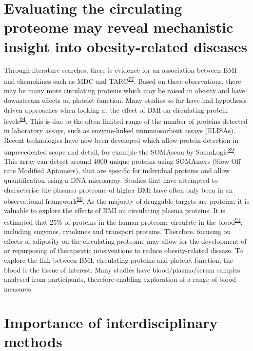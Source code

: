 \documentclass[11pt,twoside]{bristolthesis}
\begin{document}
\hypertarget{evaluating-the-circulating-proteome-may-reveal-mechanistic-insight-into-obesity-related-diseases}{%
\section{Evaluating the circulating proteome may reveal mechanistic insight into obesity-related diseases}\label{evaluating-the-circulating-proteome-may-reveal-mechanistic-insight-into-obesity-related-diseases}}

Through literature searches, there is evidence for an association between BMI and chemokines such as MDC and TARC\textsuperscript{\protect\hyperlink{ref-Kitahara2014}{77}}. Based on these observations, there may be many more circulating proteins which may be raised in obesity and have downstream effects on platelet function. Many studies so far have had hypothesis driven approaches when looking at the effect of BMI on circulating protein levels\textsuperscript{\protect\hyperlink{ref-Timpson2011}{84}}. This is due to the often limited range of the number of proteins detected in laboratory assays, such as enzyme-linked immunosorbent assays (ELISAs). Recent technologies have now been developed which allow protein detection in unprecedented scope and detail, for example the SOMAscan by SomaLogic\textsuperscript{\protect\hyperlink{ref-Gold2012}{89}}. This array can detect around 4000 unique proteins using SOMAmers (Slow Off-rate Modified Aptamers), that are specific for individual proteins and allow quantification using a DNA microarray. Studies that have attempted to characterise the plasmsa proteome of higher BMI have often only been in an observational framework\textsuperscript{\protect\hyperlink{ref-Cominetti2018}{90}}. As the majority of druggable targets are proteins, it is valuable to explore the effects of BMI on circulating plasma proteins. It is estimated that 25\% of proteins in the human proteome circulate in the blood\textsuperscript{\protect\hyperlink{ref-Imming2006}{91}}, including enzymes, cytokines and transport proteins. Therefore, focusing on effects of adiposity on the circulating proteome may allow for the development of or repurposing of therapeutic interventions to reduce obesity-related disease. To explore the link between BMI, circulating proteins and platelet function, the blood is the tissue of interest. Many studies have blood/plasma/serum samples analysed from participants, therefore enabling exploration of a range of blood measures.

\hypertarget{importance-of-interdisciplinary-methods}{%
\section{Importance of interdisciplinary methods}\label{importance-of-interdisciplinary-methods}}
\end{document}
